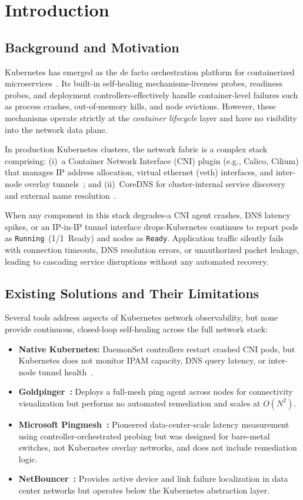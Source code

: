 \documentclass[conference]{IEEEtran}
\begin{document}
\section{Introduction}

\subsection{Background and Motivation}
Kubernetes has emerged as the de facto orchestration platform for containerized microservices~\cite{k8s-docs}. Its built-in self-healing mechanisms-liveness probes, readiness probes, and deployment controllers-effectively handle container-level failures such as process crashes, out-of-memory kills, and node evictions. However, these mechanisms operate strictly at the \emph{container lifecycle} layer and have no visibility into the network data plane.

In production Kubernetes clusters, the network fabric is a complex stack comprising: (i)~a Container Network Interface (CNI) plugin (e.g., Calico, Cilium) that manages IP address allocation, virtual ethernet (veth) interfaces, and inter-node overlay tunnels~\cite{cni-spec, calico-docs}; and (ii)~CoreDNS for cluster-internal service discovery and external name resolution~\cite{coredns-docs}.

When any component in this stack degrades-a CNI agent crashes, DNS latency spikes, or an IP-in-IP tunnel interface drops-Kubernetes continues to report pods as \texttt{Running}~(1/1~Ready) and nodes as \texttt{Ready}. Application traffic silently fails with connection timeouts, DNS resolution errors, or unauthorized packet leakage, leading to cascading service disruptions without any automated recovery.

\subsection{Existing Solutions and Their Limitations}

Several tools address aspects of Kubernetes network observability, but none provide continuous, closed-loop self-healing across the full network stack:

\begin{itemize}
  \item \textbf{Native Kubernetes:} DaemonSet controllers restart crashed CNI pods, but Kubernetes does not monitor IPAM capacity, DNS query latency, or inter-node tunnel health~\cite{k8s-docs}.
  \item \textbf{Goldpinger~\cite{goldpinger}:} Deploys a full-mesh ping agent across nodes for connectivity visualization but performs no automated remediation and scales at $O(N^2)$.
  \item \textbf{Microsoft Pingmesh~\cite{pingmesh2015}:} Pioneered data-center-scale latency measurement using controller-orchestrated probing but was designed for bare-metal switches, not Kubernetes overlay networks, and does not include remediation logic.
  \item \textbf{NetBouncer~\cite{netbouncer2019}:} Provides active device and link failure localization in data center networks but operates below the Kubernetes abstraction layer.
\end{itemize}
\end{document}
